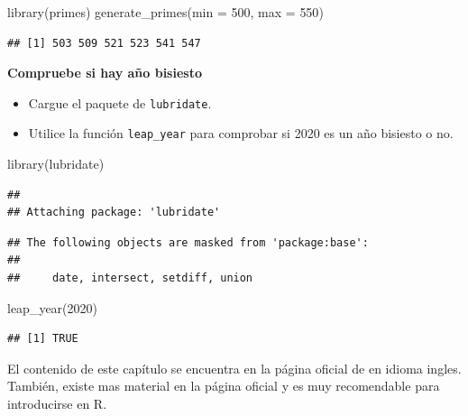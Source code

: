 \documentclass[
]{book}
\newenvironment{Shaded}{\begin{snugshade}}{\end{snugshade}}
\newcommand{\AttributeTok}[1]{\textcolor[rgb]{0.77,0.63,0.00}{#1}}
\newcommand{\DecValTok}[1]{\textcolor[rgb]{0.00,0.00,0.81}{#1}}
\newcommand{\FunctionTok}[1]{\textcolor[rgb]{0.00,0.00,0.00}{#1}}
\newcommand{\NormalTok}[1]{#1}
\providecommand{\tightlist}{%
  \setlength{\itemsep}{0pt}\setlength{\parskip}{0pt}}
\begin{document}
\begin{Shaded}
\begin{Highlighting}[]
\FunctionTok{library}\NormalTok{(primes)}
\FunctionTok{generate\_primes}\NormalTok{(}\AttributeTok{min =} \DecValTok{500}\NormalTok{, }\AttributeTok{max =} \DecValTok{550}\NormalTok{)}
\end{Highlighting}
\end{Shaded}

\begin{verbatim}
## [1] 503 509 521 523 541 547
\end{verbatim}

\textbf{Compruebe si hay año bisiesto}

\begin{itemize}
\tightlist
\item
  Cargue el paquete de \texttt{lubridate}.
\item
  Utilice la función \texttt{leap\_year} para comprobar si 2020 es un año bisiesto o no.
\end{itemize}

\begin{Shaded}
\begin{Highlighting}[]
\FunctionTok{library}\NormalTok{(lubridate)}
\end{Highlighting}
\end{Shaded}

\begin{verbatim}
## 
## Attaching package: 'lubridate'
\end{verbatim}

\begin{verbatim}
## The following objects are masked from 'package:base':
## 
##     date, intersect, setdiff, union
\end{verbatim}

\begin{Shaded}
\begin{Highlighting}[]
\FunctionTok{leap\_year}\NormalTok{(}\DecValTok{2020}\NormalTok{)}
\end{Highlighting}
\end{Shaded}

\begin{verbatim}
## [1] TRUE
\end{verbatim}

El contenido de este capítulo se encuentra en la página oficial de \citep{quantargo1} en idioma ingles. También, existe mas material en la página oficial y es muy recomendable para introducirse en R.
\end{document}
